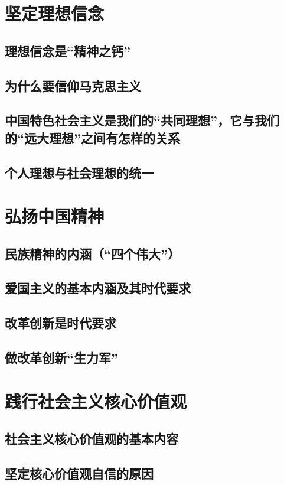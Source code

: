 \section{坚定理想信念}
\subsection{理想信念是“精神之钙”}
\subsection{为什么要信仰马克思主义}
\subsection{中国特色社会主义是我们的“共同理想”，它与我们的“远大理想”之间有怎样的关系}
\subsection{个人理想与社会理想的统一}

\section{弘扬中国精神}
\subsection{民族精神的内涵（“四个伟大”）}
\subsection{爱国主义的基本内涵及其时代要求}
\subsection{改革创新是时代要求}
\subsection{做改革创新“生力军”}

\section{践行社会主义核心价值观}
\subsection{社会主义核心价值观的基本内容}
\subsection{坚定核心价值观自信的原因}
